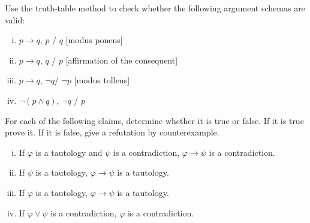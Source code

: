 \documentclass[nobib,nofonts]{tufte-handout}
\newcommand{\mygray}[1]{\textcolor{mygray2}{#1}}
\begin{document}
\bigskip
\noindent \colorbox{mygray}{\centering
  \begin{minipage}{1.0\textwidth}

    \begin{exercise}
      Use the truth-table method to check whether the following argument schemas are valid:
      \begin{enumerate}[(i)]
        \item $p \rightarrow q$, $p$ / $q$ \hfill [\mygray{modus ponens}]
        \item $p \rightarrow q$, $q$ / $p$ \hfill [\mygray{affirmation of the consequent}]
        \item $p \rightarrow q$, $\neg q$/ $\neg p$ \hfill [\mygray{modus tollens}]
        \item $\neg(p \wedge q)$, $\neg q$ / $p$
      \end{enumerate}
    \end{exercise}

    \begin{exercise}
      For each of the following claims, determine whether it is true or false. If it is true prove it. If it is false, give a refutation by counterexample.
      \begin{enumerate}[(i)]
        \item If $\varphi$ is a tautology and $\psi$ is a contradiction,  $\varphi \rightarrow \psi$ is a contradiction.
        \item If $\psi$ is a tautology,  $\varphi \rightarrow \psi$ is a tautology.
        \item If $\varphi$ is a tautology,  $\varphi \rightarrow \psi$ is a tautology.
        \item If $\varphi \vee \psi$ is a contradiction,  $\varphi$ is a contradiction.
      \end{enumerate}
    \end{exercise}
  \end{minipage}
}
\end{document}
